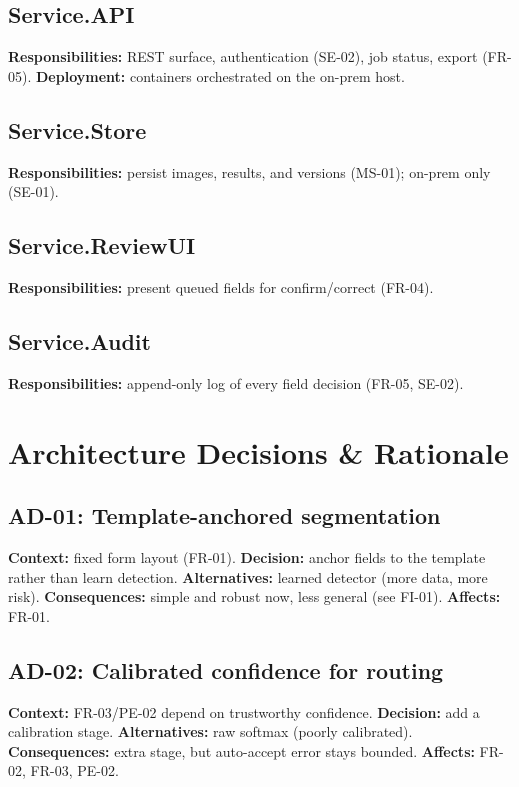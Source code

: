\documentclass[11pt,letterpaper]{article}
\begin{document}
\subsection{Service.API}
\textbf{Responsibilities:} REST surface, authentication (SE-02), job status, export
(FR-05). \textbf{Deployment:} containers orchestrated on the on-prem host.
\subsection{Service.Store}
\textbf{Responsibilities:} persist images, results, and versions (MS-01); on-prem
only (SE-01).
\subsection{Service.ReviewUI}
\textbf{Responsibilities:} present queued fields for confirm/correct (FR-04).
\subsection{Service.Audit}
\textbf{Responsibilities:} append-only log of every field decision (FR-05, SE-02).

\section{Architecture Decisions \& Rationale}
\subsection{AD-01: Template-anchored segmentation}
\textbf{Context:} fixed form layout (FR-01). \textbf{Decision:} anchor fields to the
template rather than learn detection. \textbf{Alternatives:} learned detector (more
data, more risk). \textbf{Consequences:} simple and robust now, less general (see
FI-01). \textbf{Affects:} FR-01.
\subsection{AD-02: Calibrated confidence for routing}
\textbf{Context:} FR-03/PE-02 depend on trustworthy confidence. \textbf{Decision:}
add a calibration stage. \textbf{Alternatives:} raw softmax (poorly calibrated).
\textbf{Consequences:} extra stage, but auto-accept error stays bounded. \textbf{Affects:} FR-02, FR-03, PE-02.
\end{document}
